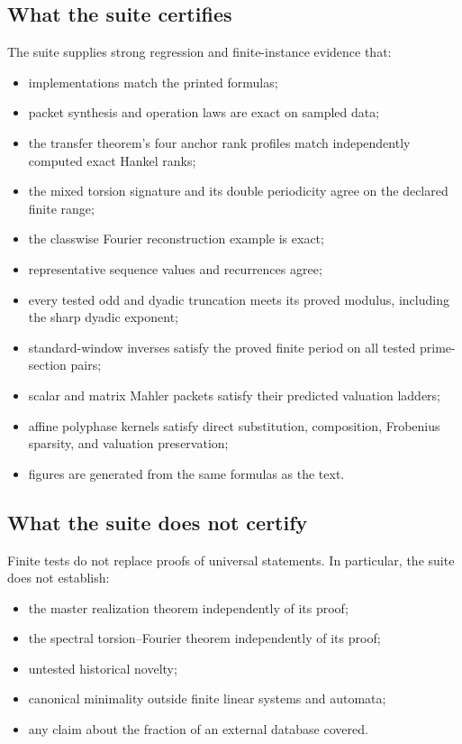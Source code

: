 \documentclass[11pt]{article}
\theoremstyle{definition}\newtheorem{definition}[theorem]{Definition}\newtheorem{example}[theorem]{Example}\newtheorem{construction}[theorem]{Construction}\newtheorem{algorithm}[theorem]{Algorithm}\newtheorem{conjecture}[theorem]{Conjecture}\newtheorem{problem}[theorem]{Problem}
\theoremstyle{remark}\newtheorem{remark}[theorem]{Remark}\newtheorem{boundary}[theorem]{Boundary}\newtheorem{certificate}[theorem]{Computational Certificate}\newtheorem{classical}[theorem]{Classical Input}\newtheorem{principle}[theorem]{Structural Principle}
\begin{document}
\subsection{What the suite certifies}
The suite supplies strong regression and finite-instance evidence that:
\begin{itemize}
\item implementations match the printed formulas;
\item packet synthesis and operation laws are exact on sampled data;
\item the transfer theorem's four anchor rank profiles match independently computed exact Hankel ranks;
\item the mixed torsion signature and its double periodicity agree on the declared finite range;
\item the classwise Fourier reconstruction example is exact;
\item representative sequence values and recurrences agree;
\item every tested odd and dyadic truncation meets its proved modulus, including the sharp dyadic exponent;
\item standard-window inverses satisfy the proved finite period on all tested prime-section pairs;
\item scalar and matrix Mahler packets satisfy their predicted valuation ladders;
\item affine polyphase kernels satisfy direct substitution, composition, Frobenius sparsity, and valuation preservation;
\item figures are generated from the same formulas as the text.
\end{itemize}

\subsection{What the suite does not certify}
Finite tests do not replace proofs of universal statements.  In particular, the suite does not establish:
\begin{itemize}
\item the master realization theorem independently of its proof;
\item the spectral torsion--Fourier theorem independently of its proof;
\item untested historical novelty;
\item canonical minimality outside finite linear systems and automata;
\item any claim about the fraction of an external database covered.
\end{itemize}
\end{document}
